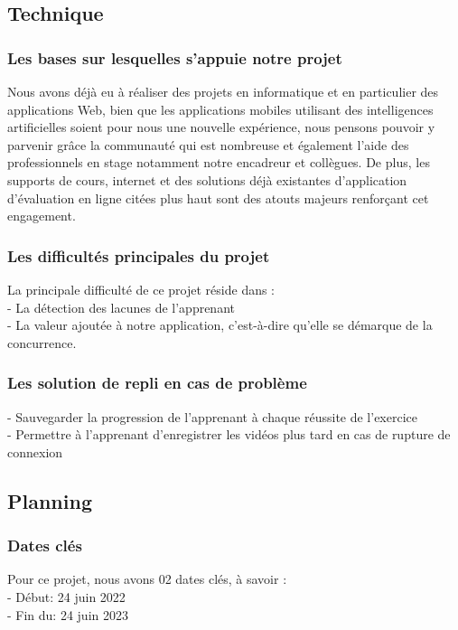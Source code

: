 \subsection{Technique }

\subsubsection{Les bases sur lesquelles s’appuie notre projet }
	Nous avons déjà eu à réaliser des projets en informatique et en particulier des applications Web, bien que les applications mobiles utilisant des intelligences artificielles soient pour nous une nouvelle expérience, nous pensons pouvoir y parvenir grâce la communauté qui est nombreuse et également l’aide des professionnels en stage notamment notre encadreur et collègues. De plus, les supports de cours, internet et des  solutions déjà existantes d’application d’évaluation en ligne citées plus haut sont des atouts majeurs renforçant cet engagement. 

\subsubsection{Les difficultés principales du projet}
	La principale difficulté de ce projet réside dans : \\
	- La détection des lacunes de l’apprenant \\
	- La  valeur ajoutée à notre application, c’est-à-dire qu’elle se démarque de la concurrence. 

\subsubsection{Les solution de repli en cas de problème}
	- Sauvegarder la progression de l’apprenant à chaque réussite de l’exercice\\
	- Permettre à l’apprenant d’enregistrer les vidéos plus tard en cas de rupture de connexion

\subsection{Planning }
\subsubsection{Dates clés}
	Pour ce projet, nous avons 02 dates clés, à savoir : \\
		- Début: 24 juin 2022 \\
		- Fin du: 24 juin 2023

